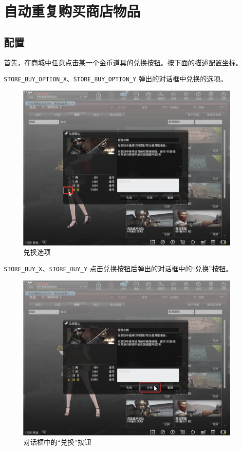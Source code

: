\section{自动重复购买商店物品}

\subsection{配置}

首先，在商城中任意点击某一个金币道具的兑换按钮。按下面的描述配置坐标。

\lstinline{STORE_BUY_OPTION_X}、\lstinline{STORE_BUY_OPTION_Y} 弹出的对话框中兑换的选项。

\begin{figure}[H]
    \Centering
    \includegraphics[width=\textwidth]{docs/assets/store_buy_option.png}
    \caption{兑换选项}
\end{figure}

\lstinline{STORE_BUY_X}、\lstinline{STORE_BUY_Y} 点击兑换按钮后弹出的对话框中的“兑换”按钮。

\begin{figure}[H]
    \Centering
    \includegraphics[width=\textwidth]{docs/assets/store_purchase.png}
    \caption{对话框中的“兑换”按钮}
\end{figure}

